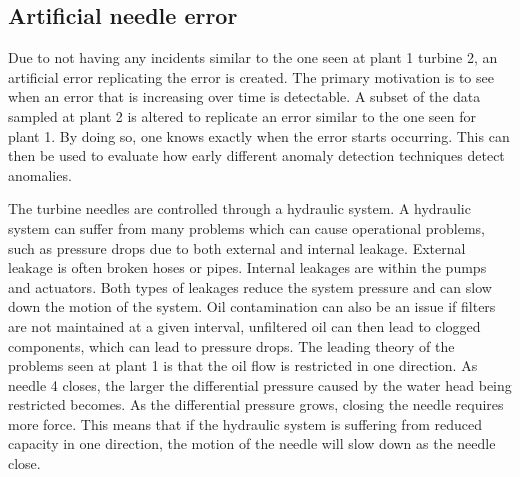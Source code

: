         
    
        
        
        
        
         
         
    \subsection{Artificial needle error}\label{subsec:arti}
        Due to not having any incidents similar to the one seen at plant 1 turbine 2, an artificial error replicating the error is created. The primary motivation is to see when an error that is increasing over time is detectable. A subset of the data sampled at plant 2 is altered to replicate an error similar to the one seen for plant 1. By doing so, one knows exactly when the error starts occurring. This can then be used to evaluate how early different anomaly detection techniques detect anomalies.
    
        The turbine needles are controlled through a hydraulic system. A hydraulic system can suffer from many problems which can cause operational problems, such as pressure drops due to both external and internal leakage. External leakage is often broken hoses or pipes. Internal leakages are within the pumps and actuators. Both types of leakages reduce the system pressure and can slow down the motion of the system. Oil contamination can also be an issue if filters are not maintained at a given interval, unfiltered oil can then lead to clogged components, which can lead to pressure drops. The leading theory of the problems seen at plant 1 is that the oil flow is restricted in one direction. As needle 4 closes, the larger the differential pressure caused by the water head being restricted becomes. As the differential pressure grows, closing the needle requires more force. This means that if the hydraulic system is suffering from reduced capacity in one direction, the motion of the needle will slow down as the needle close. 
        
